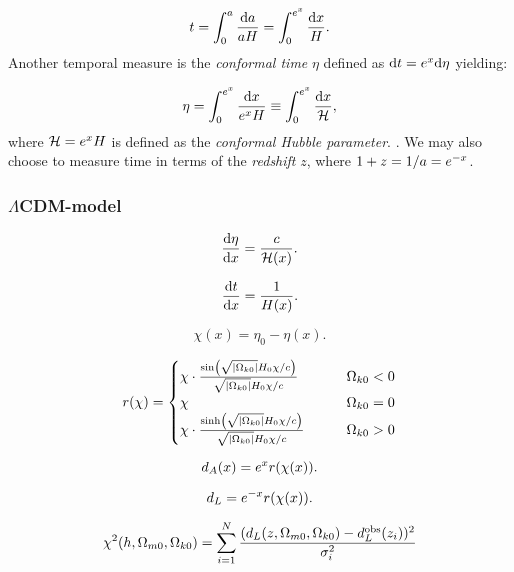     \begin{equation}\label{eq:m1:theory:measures:cosmic_time}
        t = \int_0^a\frac{\mathrm{d} a}{aH} = \int_0^{e^x}\frac{\mathrm{d} x}{H}.
    \end{equation}
    Another temporal measure is the \textit{conformal time} $\eta$ defined as $\mathrm{d} t = e^x\mathrm{d}\eta$ yielding:

    \begin{equation}
        \eta = \int_0^{e^x}\frac{\mathrm{d} x}{e^xH} \equiv \int_0^{e^x}\frac{\mathrm{d} x}{\mathcal{H}},
    \end{equation}
    where $\mathcal{H}=e^xH$ is defined as the \textit{conformal Hubble parameter}. . We may also choose to measure time in terms of the \textit{redshift} $z$, where $1+z = 1/a = e^{-x}$.





\subsubsection{$\Lambda$CDM-model}







\begin{equation}\label{eq:m1:eta_diff_eq}
    \dv{\eta}{x} = \frac{c}{\mathcal{H}(x)}.
\end{equation}

\begin{equation}\label{eq:m1:t_diff_eq}
    \dv{t}{x} = \frac{1}{H(x)}.
\end{equation}

\begin{equation}\label{eq:m1:co_moving_distance_def}
    \chi(x) = \eta_0 -\eta(x).
\end{equation}

\begin{equation}\label{eq:m1:r_equation_def}
    r(\chi) = \begin{cases}
        \chi \cdot \frac{\sin\left(\sqrt{\abs{\Omega_{k0}}}H_0\chi/c\right)}{\sqrt{\abs{\Omega_{k0}}}H_0\chi/c} \qquad &\Omega_{k0} < 0 \\
        \chi \qquad &\Omega_{k0} = 0 \\
        \chi \cdot \frac{\sinh\left(\sqrt{\abs{\Omega_{k0}}}H_0\chi/c\right)}{\sqrt{\abs{\Omega_{k0}}}H_0\chi/c} \qquad &\Omega_{k0} > 0
    \end{cases}
\end{equation}

\begin{equation}\label{eq:m1:angular_distance_def}
    d_A(x) = e^{x}r(\chi(x)).
\end{equation}

\begin{equation}\label{eq:m1:luminosity_distance_def}
    d_L = e^{-x}r(\chi(x)).
\end{equation}


\begin{equation}\label{eq:m1:chi2_test_def}
    \chi^2(h, \Omega_{m0}, \Omega_{k0}) = \sum_{i=1}^N \frac{(d_L(z, \Omega_{m0}, \Omega_{k0}) - d_L^\mathrm{obs}(z_i))^2}{\sigma_i^2}
\end{equation}